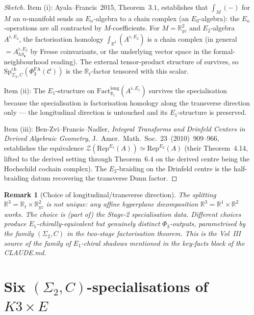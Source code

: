 \documentclass[11pt]{article}
\newtheorem{remark}[theorem]{Remark}
\newcommand{\Eone}{E_{1}}
\newcommand{\Etwo}{E_{2}}
\newcommand{\R}{\mathbb{R}}
\newcommand{\PhiFA}{\Phi^{\mathrm{FA}}}
\newcommand{\SpCh}{\mathrm{Sp}^{\mathrm{ch}}}
\newcommand{\cC}{\mathcal{C}}
\newcommand{\cZ}{\mathcal{Z}}
\newcommand{\Rep}{\mathrm{Rep}}
\begin{document}
\begin{proof}[Sketch]
Item (i): Ayala--Francis~2015, Theorem~$3.1$, establishes that
$\int_{M}(-)$ for $M$ an $n$-manifold sends an $E_{n}$-algebra to a chain
complex (an $E_{0}$-algebra): the $E_{n}$-operations are all contracted by
$M$-coefficients. For $M = \R^{2}_{yz}$ and $E_{2}$-algebra
$A^{\flat, \Etwo}$, the factorisation homology $\int_{\R^{2}}(A^{\flat, \Etwo})$
is a chain complex (in general $= A^{\flat, \Etwo}_{hS_{\bullet}}$ by Fresse
coinvariants, or the underlying vector space in the formal-neighbourhood
reading). The external tensor-product structure of
 survives, so
$\SpCh_{\Sigma_{2}, C}(\PhiFA_{3}(\cC))$ is the $\R_{t}$-factor tensored
with this scalar.

Item (ii): The $E_{1}$-structure on $\mathrm{Fact}^{\mathrm{long}}_{\R_{t}}
(A^{\flat, \Eone})$ survives the specialisation because the specialisation
is factorisation homology along the transverse direction only --- the
longitudinal direction is untouched and its $\Eone$-structure is preserved.

Item (iii): Ben-Zvi--Francis--Nadler, \emph{Integral Transforms and
Drinfeld Centers in Derived Algebraic Geometry},
J.~Amer.~Math.~Soc.~23~(2010)~909--966, establishes the equivalence
$\cZ(\Rep^{\Eone}(A)) \simeq \Rep^{\Etwo}(A)$ (their Theorem~4.14, lifted
to the derived setting through Theorem~$6.4$ on the derived centre being
the Hochschild cochain complex). The $\Etwo$-braiding on the Drinfeld
centre is the half-braiding datum recovering the transverse Dunn factor.
\end{proof}

\begin{remark}[Choice of longitudinal/transverse direction]
The splitting $\R^{3} = \R_{t} \times \R^{2}_{yz}$ is not unique: any
affine hyperplane decomposition $\R^{3} = \R^{1} \times \R^{2}$ works.
The choice is (part of) the Stage-2 specialisation data. Different
choices produce $\Eone$-chirally-equivalent but genuinely distinct
$\Phi_{3}$-outputs, parametrised by the family
$(\Sigma_{2}, C)$ in the two-stage factorisation theorem. This is the
Vol~III source of the family of $\Eone$-chiral shadows mentioned in
the key-facts block of the CLAUDE.md.
\end{remark}

\section{Six $(\Sigma_{2}, C)$-specialisations of $K3 \times E$}
\label{sec:six-specialisations}
\end{document}
